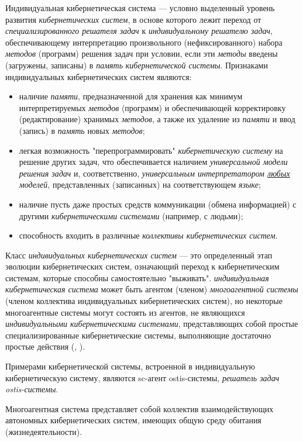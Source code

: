 Индивидуальная кибернетическая система — условно выделенный уровень развития \textit{кибернетических систем}, в основе которого лежит переход от \textit{специализированного решателя задач} к \textit{индивидуальному решателю задач}, обеспечивающему интерпретацию произвольного (нефиксированного) набора \textit{методов} (программ) решения задач при условии, если эти \textit{методы} введены (загружены, записаны) в \textit{память} \textit{кибернетической системы}.
Признаками индивидуальных кибернетических систем являются:
\begin{itemize}
    \item наличие \textit{памяти}, предназначенной для хранения как минимум интерпретируемых \textit{методов}	(программ)  и обеспечивающей корректировку (редактирование) хранимых \textit{методов}, а также их удаление из	\textit{памяти} и ввод (запись) в \textit{память} новых \textit{методов};
    \item легкая возможность "перепрограммировать"{} \textit{кибернетическую систему} на решение других задач, что обеспечивается наличием \textit{универсальной модели решения задач} и, соответственно, \textit{универсальным интерпретатором \uline{любых} моделей}, представленных (записанных) на соответствующем \textit{языке};
    \item наличие пусть даже простых средств коммуникации (обмена информацией) с другими \textit{кибернетическими системами} (например, с людьми);
    \item способность входить в различные \textit{коллективы кибернетических систем}.
\end{itemize}

Класс \textit{индивидуальных кибернетических систем} — это определенный этап эволюции кибернетических систем, означающий переход к кибернетическим системам, которые способны самостоятельно "выживать". \textit{индивидуальная кибернетическая система} может быть агентом (членом) \textit{многоагентной системы} (членом коллектива индивидуальных кибернетических систем), но некоторые многоагентные системы могут состоять из агентов, не являющихся \textit{индивидуальными кибернетическими системами}, представляющих собой простые специализированные кибернетические системы, выполняющие достаточно простые действия (, ).

Примерами кибернетической системы, встроенной в индивидуальную кибернетическую систему, являются sc-агент ostis-системы, \textit{решатель задач ostis-системы}.

Многоагентная система представляет собой коллектив взаимодействующих автономных кибернетических систем, имеющих общую среду обитания (жизнедеятельности). 

